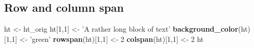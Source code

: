 \documentclass[]{article}
\newenvironment{Shaded}{\begin{snugshade}}{\end{snugshade}}
\newcommand{\KeywordTok}[1]{\textcolor[rgb]{0.13,0.29,0.53}{\textbf{{#1}}}}
\newcommand{\DecValTok}[1]{\textcolor[rgb]{0.00,0.00,0.81}{{#1}}}
\newcommand{\StringTok}[1]{\textcolor[rgb]{0.31,0.60,0.02}{{#1}}}
\newcommand{\NormalTok}[1]{{#1}}
\begin{document}
\FloatBarrier

\subsection{Row and column span}\label{row-and-column-span}

\begin{Shaded}
\begin{Highlighting}[]
\NormalTok{ht <-}\StringTok{ }\NormalTok{ht_orig}
\NormalTok{ht[}\DecValTok{1}\NormalTok{,}\DecValTok{1}\NormalTok{] <-}\StringTok{ 'A rather long block of text'}
\KeywordTok{background_color}\NormalTok{(ht)[}\DecValTok{1}\NormalTok{,}\DecValTok{1}\NormalTok{] <-}\StringTok{ 'green'}
\KeywordTok{rowspan}\NormalTok{(ht)[}\DecValTok{1}\NormalTok{,}\DecValTok{1}\NormalTok{] <-}\StringTok{ }\DecValTok{2}
\KeywordTok{colspan}\NormalTok{(ht)[}\DecValTok{1}\NormalTok{,}\DecValTok{1}\NormalTok{] <-}\StringTok{ }\DecValTok{2}
\NormalTok{ht   }
\end{Highlighting}
\end{Shaded}
\end{document}
